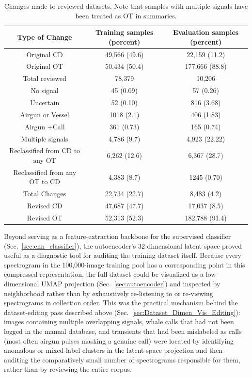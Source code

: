 \documentclass[preprint,NumberedRefs]{JASAnew}
\begin{document}
\begin{table}
    \centering
    \begin{tabular}{ccc}
       Type of Change  &  Training samples (percent) &Evaluation samples (percent)\\
         \hline
         Original CD & 49,566 (49.6) &22,159 (11.2)\\
         Original OT & 50,434 (50.4) & 177,666 (88.8)\\
       Total reviewed  & 78,379  & 10,206\\
       \hline
       No signal & 45 (0.09) & 57 (0.26)\\
      Uncertain & 52 (0.10) & 816  (3.68) \\
      Airgun or Vessel & 1018 (2.1) &406  (1.83) \\
      Airgun +Call & 361  (0.73)& 165 (0.74)\\
      Multiple signals   &4,786 (9.7)  & 4,923 (22.22)\\
      \hline
      Reclassified from CD to any OT   & 6,262 (12.6) &  6,367 (28.7)\\
       Reclassified from any OT to CD  & 4,383 (8.7) & 1245 (0.70)\\
        
     Total Changes    & 22,734 (22.7) &8,483 (4.2) \\
     \hline
     Revised CD& 47,687 (47.7) & 17,037 (8.5)\\
     Revised OT& 52,313 (52.3) & 182,788 (91.4)\\
    \end{tabular}
    \caption{Changes made to reviewed datasets.  Note that samples with multiple signals have been treated as OT in summaries.}
    \label{tab:Reviewed dataset changes}
\end{table}

Beyond serving as a feature-extraction backbone for the supervised classifier
(Sec.~\ref{sec:cnn_classifier}), the autoencoder's 32-dimensional latent space
proved useful as a diagnostic tool for auditing the training dataset itself.
Because every spectrogram in the 100,000-image training pool has a
corresponding point in this compressed representation, the full dataset
could be visualized as a low-dimensional UMAP projection
(Sec.~\ref{sec:autoencoder}) and inspected by neighborhood rather than by
exhaustively re-listening to or re-viewing spectrograms in collection order.
This was the practical mechanism behind the dataset-editing pass described
above (Sec.~\ref{sec:Dataset_Dimen_Vis_Editing}): images containing multiple
overlapping signals, whale calls that had not been logged in the manual
database, and transients that had been mislabeled as calls (most often
airgun pulses masking a genuine call) were located by identifying anomalous
or mixed-label clusters in the latent-space projection and then auditing
the comparatively small number of spectrograms responsible for them, rather
than by reviewing the entire corpus.
\end{document}
